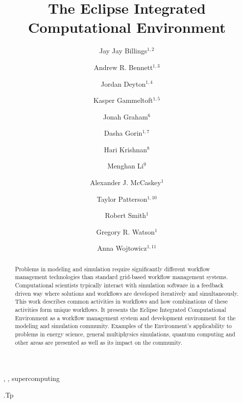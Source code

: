 \documentclass{elsart}
\begin{document}
\begin{frontmatter}

\title{The Eclipse Integrated Computational Environment}

\author{Jay Jay Billings$^{1,2}$}
\author{Andrew R. Bennett$^{1,3}$}
\author{Jordan Deyton$^{1,4}$}
\author{Kasper Gammeltoft$^{1,5}$}
\author{Jonah Graham$^{6}$}
\author{Dasha Gorin$^{1,7}$}
\author{Hari Krishnan$^{8}$}
\author{Menghan Li$^{9}$}
\author{Alexander J. McCaskey$^{1}$}
\author{Taylor Patterson$^{1,10}$}
\author{Robert Smith$^{1}$}
\author{Gregory R. Watson$^{1}$}
\author{Anna Wojtowicz$^{1,11}$}

\address{$^1$Computer Science and Mathematics Division, Oak Ridge National
Laboratory, Oak Ridge, TN 37830, USA}
\address{$^2$The Bredesen Center for Interdisciplinary Research and Graduate
Education, University of Tennessee, 444 Greve Hall, 821 Volunteer
  Blvd. Knoxville, TN 37996-3394}
\address{$^3$University of Washington, Seattle, WA 98105}
\address{$^4$General Electric Company, 3200 North Grandview Blvd Waukesha, WI
53188-1678}
\address{$^5$Georgia Institute of Technology North Avenue, Atlanta, GA 30332}
\address{$^6$Kichwa Coders Ltd. 1 Plomer Green Avenue Downley, High Wycombe
HP13 5LN United Kingdom}
\address{$^7$Northwestern University 633 Clark Street Evanston, IL 60208}
\address{$^8$Lawrence Berkeley National Laboratory, 1 Cyclotron Rd, Berkeley,
CA 94720}
\address{$^9$Department of Computer Science, and Department of Biological
Sciences, Purdue University, West Lafayette, IN 47906} 
\address{$^10$Acato Information Management, LLC 114 Union Valley Rd. Oak Ridge,
TN 37830}
\address{$^11$Colorado State University Fort Collins, CO 80523}

\begin{abstract}

Problems in modeling and simulation require significantly different
workflow management technologies than standard grid-based workflow
management systems. Computational scientists typically interact with
simulation software in a feedback driven way where solutions and
workflows are developed iteratively and simultaneously. This work
describes common activities in workflows and how combinations of these
activities form unique workflows. It presents the Eclipse Integrated
Computational Environment as a workflow management system and
development environment for the modeling and simulation community.
Examples of the Environment's applicability to problems in energy
science, general multiphysics simulations, quantum computing and other
areas are presented as well as its impact on the community.

\end{abstract}

\begin{keyword}
\sep
\sep 
supercomputing

\vspace{1ex}

.Tp %

\end{keyword}

\end{frontmatter}
\end{document}
